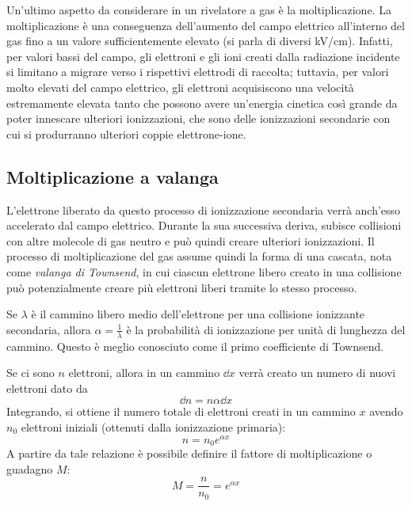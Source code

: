 Un'ultimo aspetto da considerare in un rivelatore a gas è la moltiplicazione. La moltiplicazione è una conseguenza dell'aumento del campo elettrico all'interno del gas fino a un valore sufficientemente elevato (si parla di diversi kV/cm). Infatti, per valori bassi del campo, gli elettroni e gli ioni creati dalla radiazione incidente si limitano a migrare verso i rispettivi elettrodi di raccolta; tuttavia, per valori molto elevati del campo elettrico, gli elettroni acquisiscono una velocità estremamente elevata tanto che possono avere un'energia cinetica così grande da poter innescare ulteriori ionizzazioni, che sono delle ionizzazioni secondarie con cui si produrranno ulteriori coppie elettrone-ione.

\subsection{Moltiplicazione a valanga}
L'elettrone liberato da questo processo di ionizzazione secondaria verrà anch'esso accelerato dal campo elettrico. Durante la sua successiva deriva, subisce collisioni con altre molecole di gas neutro e può quindi creare ulteriori ionizzazioni. Il processo di moltiplicazione del gas assume quindi la forma di una cascata, nota come \textit{valanga di Townsend}, in cui ciascun elettrone libero creato in una collisione può potenzialmente creare più elettroni liberi tramite lo stesso processo.

Se $\lambda$ è il cammino libero medio dell'elettrone per una collisione ionizzante secondaria, allora $\alpha=\frac{1}{\lambda}$ è la probabilità di ionizzazione per unità di lunghezza del cammino. Questo è meglio conosciuto come il primo coefficiente di Townsend.

Se ci sono $n$ elettroni, allora in un cammino $\dd{x}$ verrà creato un numero di nuovi elettroni dato da
\begin{equation*}
   \dd{n}=n\alpha\dd{x}
\end{equation*}
Integrando, si ottiene il numero totale di elettroni creati in un cammino $x$ avendo $n_0$ elettroni iniziali (ottenuti dalla ionizzazione primaria):
\begin{equation*}
   n=n_0e^{\alpha x}
\end{equation*}
A partire da tale relazione è possibile definire il fattore di moltiplicazione o guadagno $M$:
\begin{equation*}
   M=\frac{n}{n_0}=e^{\alpha x}
\end{equation*}

